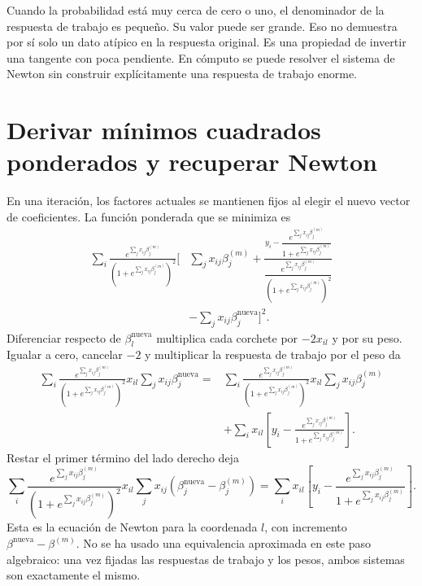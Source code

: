 \documentclass[11pt,a4paper]{article}
\begin{document}
Cuando la probabilidad está muy cerca de cero o uno,
el denominador de la respuesta de trabajo es pequeño.
Su valor puede ser grande. Eso no demuestra por sí solo
un dato atípico en la respuesta original.
Es una propiedad de invertir una tangente con poca pendiente.
En cómputo se puede resolver el sistema de Newton sin construir
explícitamente una respuesta de trabajo enorme.

\clearpage
\section{Derivar mínimos cuadrados ponderados y recuperar Newton}\label{logit48}
En una iteración, los factores actuales se mantienen fijos
al elegir el nuevo vector de coeficientes.
La función ponderada que se minimiza es
\[
\begin{aligned}
\sum_i
\frac{e^{\sum_jx_{ij}\beta_j^{(m)}}}
{(1+e^{\sum_jx_{ij}\beta_j^{(m)}})^2}
\bigg[&
\sum_jx_{ij}\beta_j^{(m)}
+\frac{y_i-\dfrac{e^{\sum_jx_{ij}\beta_j^{(m)}}}
{1+e^{\sum_jx_{ij}\beta_j^{(m)}}}}
{\dfrac{e^{\sum_jx_{ij}\beta_j^{(m)}}}
{(1+e^{\sum_jx_{ij}\beta_j^{(m)}})^2}}\\
&-\sum_jx_{ij}\beta_j^{\mathrm{nueva}}\bigg]^2.
\end{aligned}
\]
Diferenciar respecto de $\beta_l^{\mathrm{nueva}}$ multiplica
cada corchete por $-2x_{il}$ y por su peso.
Igualar a cero, cancelar $-2$ y multiplicar la respuesta de
trabajo por el peso da
\[
\begin{aligned}
\sum_i
\frac{e^{\sum_jx_{ij}\beta_j^{(m)}}}
{(1+e^{\sum_jx_{ij}\beta_j^{(m)}})^2}
x_{il}\sum_jx_{ij}\beta_j^{\mathrm{nueva}}
={}&\sum_i
\frac{e^{\sum_jx_{ij}\beta_j^{(m)}}}
{(1+e^{\sum_jx_{ij}\beta_j^{(m)}})^2}
x_{il}\sum_jx_{ij}\beta_j^{(m)}\\
&+\sum_i x_{il}\left[y_i-
\frac{e^{\sum_jx_{ij}\beta_j^{(m)}}}
{1+e^{\sum_jx_{ij}\beta_j^{(m)}}}\right].
\end{aligned}
\]
Restar el primer término del lado derecho deja
\[
\sum_i
\frac{e^{\sum_jx_{ij}\beta_j^{(m)}}}
{(1+e^{\sum_jx_{ij}\beta_j^{(m)}})^2}
x_{il}\sum_jx_{ij}
(\beta_j^{\mathrm{nueva}}-\beta_j^{(m)})
=\sum_i x_{il}\left[y_i-
\frac{e^{\sum_jx_{ij}\beta_j^{(m)}}}
{1+e^{\sum_jx_{ij}\beta_j^{(m)}}}\right].
\]
Esta es la ecuación de Newton para la coordenada $l$,
con incremento $\beta^{\mathrm{nueva}}-\beta^{(m)}$.
No se ha usado una equivalencia aproximada en este paso algebraico:
una vez fijadas las respuestas de trabajo y los pesos,
ambos sistemas son exactamente el mismo.
\end{document}
